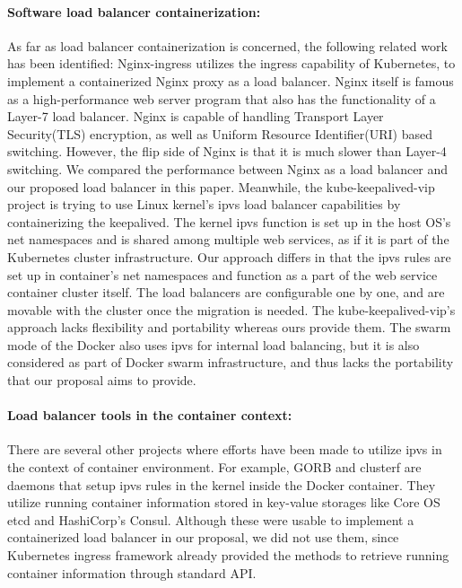 \paragraph{\bf Software load balancer containerization:}
As far as load balancer containerization is concerned, the following related work has been identified:
Nginx-ingress\cite{Pleshakov2016,NginxInc2016} utilizes the ingress\cite{K8sIngress2017} capability of Kubernetes, 
to implement a containerized Nginx proxy as a load balancer. Nginx itself is famous as a high-performance web server program
that also has the functionality of a Layer-7 load balancer. Nginx is capable of handling Transport Layer Security(TLS) encryption, 
as well as Uniform Resource Identifier(URI) based switching. However, the flip side of Nginx is that it is much slower than Layer-4 switching.
We compared the performance between Nginx as a load balancer and our proposed load balancer in this paper.
%
Meanwhile, the kube-keepalived-vip\cite{Prashanth2016} project is trying to use Linux kernel's ipvs\cite{Zhang2000} 
load balancer capabilities by containerizing the keepalived\cite{ACassen2016}.
The kernel ipvs function is set up in the host OS's net namespaces and is shared among multiple web services,
as if it is part of the Kubernetes cluster infrastructure.
Our approach differs in that the ipvs rules are set up in container's net namespaces 
and function as a part of the web service container cluster itself.
The load balancers are configurable one by one, and are  movable with the cluster once the migration is needed.
The kube-keepalived-vip's approach lacks flexibility and portability whereas ours provide them.
%
The swarm mode of the Docker\cite{DockerCoreEngineering2016,DockerInc2017} also uses ipvs for internal load balancing,
but it is also considered as part of Docker swarm infrastructure, 
and thus lacks the portability that our proposal aims to provide.

\paragraph{\bf Load balancer tools in the container context:}
There are several other projects where efforts have been made to utilize ipvs in the context of container environment.
For example, GORB\cite{Sibiryov2015} and clusterf\cite{Aaltodoc:http://urn.fi/URN:NBN:fi:aalto-201611025433} are daemons 
that setup ipvs rules in the kernel inside the Docker container. 
They utilize running container information stored in key-value storages
like Core OS etcd\cite{CoreOSEtcd} and HashiCorp's Consul\cite{HashiCorpConsul}. 
Although these were usable to implement a containerized load balancer in our proposal, we did not use them, 
since Kubernetes ingress framework already provided the methods to retrieve running container information through standard API.

